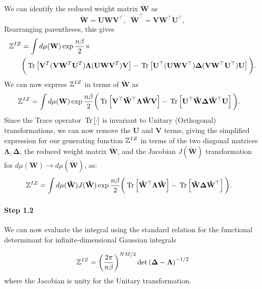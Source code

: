 We can identify the reduced weight matrix $\mathbf{\check{W}}$ as
\begin{equation}
   \label{eqn:Wcheck}
   \mathbf{\check{W}}=\mathbf{U}\mathbf{W}\mathbf{V}^{\top},\;\;
   \mathbf{\check{W}}^{\top}=\mathbf{V}\mathbf{W}^{\top}\mathbf{U}^{\top}  ,
\end{equation}
Rearranging parentheses, this gives 
\begin{align}
\mathbb{Z}^{IZ} &= \int d\mu(\mathbf{W}) \exp\frac{n\beta}{2}\times  \\ \nonumber
&\bigg(\mbox{}\operatorname{Tr}\left[\mathbf{V}^T(\mathbf{V}\mathbf{W}^T\mathbf{U}^T)\mathbf{\Lambda}(\mathbf{U}\mathbf{W}\mathbf{V}^T)\mathbf{V}\right]  
-\mbox{}\operatorname{Tr}\left[ \mathbf{U}^{\top}(\mathbf{U} \mathbf{W}\mathbf{V}^{\top})\mathbf{\Delta}(\mathbf{V}\mathbf{W}^{\top} \mathbf{U}^{\top})\mathbf{U} \right]\bigg)  .
\end{align}
We can now express $\mathbb{Z}^{IZ}$ in terms of $\mathbf{\check{W}}$ as
\begin{align}
\label{eqn:hciz-W-red}
\mathbb{Z}^{IZ} &= \int d\mu(\mathbf{W})\exp\frac{n\beta}{2}
 \bigg(\mbox{}\operatorname{Tr}\left[\mathbf{V}^{\top}\mathbf{\check{W}}^{\top}\mathbf{\Lambda}\mathbf{\check{W}}\mathbf{V}\right] 
 -\mbox{}\operatorname{Tr}\left[\mathbf{U}^{\top}\mathbf{\check{W}}\mathbf{\Delta}\mathbf{\check{W}}^{\top}\mathbf{U}\right]\bigg)  .
\end{align}
Since the Trace operator $\mbox{}\operatorname{Tr}\left[\cdot\right]$ is invariant to Unitary (Orthogonal) transformations, we can
now remove the
$\mathbf{U}$ and $\mathbf{V}$ terms, giving the simplified expression
for our generating function $\mathbb{Z}^{IZ}$ in terms of
the two diagonal matrices $\mathbf{\Lambda}, \mathbf{\Delta}$, 
the reduced weight matrix $\mathbf{\check{W}}$, and
the Jacobian $J(\mathbf{\check{W}})$ transformation for $d\mu(\mathbf{W})\rightarrow d\mu(\mathbf{\check{W}})$, as:
\begin{align}
\label{eqn:hciz-W-red2}
    \mathbb{Z}^{IZ} & =\int d\mu(\mathbf{\check{W}})J(\mathbf{\check{W}})\exp\frac{n\beta}{2}
 \bigg( \mbox{}\operatorname{Tr}\left[\mathbf{\check{W}}^{\top}\mathbf{\Lambda}\mathbf{\check{W}}\right] 
       -\mbox{}\operatorname{Tr}\left[\mathbf{\check{W}}\mathbf{\Delta} \mathbf{\check{W}}^{\top}\right] \bigg)  .
\end{align}


\paragraph{Step 1.2}
We can now evaluate the
integral using the standard relation for the functional determinant for infinite-dimensional Gaussian integrals~\cite{EngelAndVanDenBroeck}

\begin{equation}
\label{eqn:hciz-det}
    \mathbb{Z}^{IZ}=\left(\dfrac{2\pi}{n\beta}\right)^{NM/2}\det\left(\mathbf{\Delta}-\mathbf{\Lambda}\right)^{-1/2}
\end{equation}
where the Jacobian is unity for the Unitary transformation.

